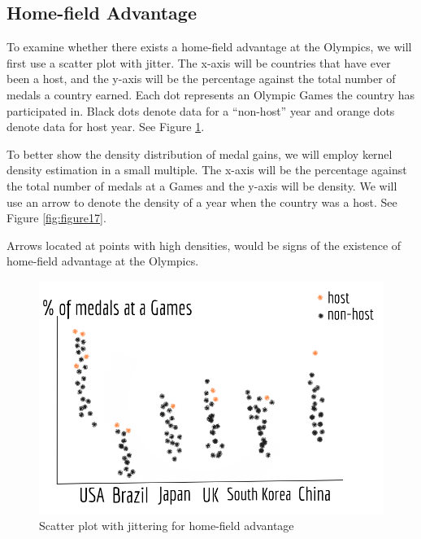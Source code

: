 \documentclass[
]{article}
\begin{document}
\hypertarget{plans-homefield}{%
\subsection{Home-field Advantage}\label{plans-homefield}}

To examine whether there exists a home-field advantage at the Olympics, we will first use a scatter plot with jitter. The x-axis will be countries that have ever been a host, and the y-axis will be the percentage against the total number of medals a country earned. Each dot represents an Olympic Games the country has participated in. Black dots denote data for a ``non-host'' year and orange dots denote data for host year. See Figure \ref{fig:figure16}.

To better show the density distribution of medal gains, we will employ kernel density estimation in a small multiple. The x-axis will be the percentage against the total number of medals at a Games and the y-axis will be density. We will use an arrow to denote the density of a year when the country was a host. See Figure \ref{fig:figure17}.

Arrows located at points with high densities, would be signs of the existence of home-field advantage at the Olympics.

\begin{figure}

{\centering \includegraphics[width=0.8\linewidth]{static/pics/5} 

}

\caption{Scatter plot with jittering for home-field advantage}\label{fig:figure16}
\end{figure}
\end{document}
